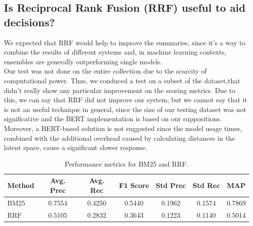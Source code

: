 \subsection{Is Reciprocal Rank Fusion (RRF) useful to aid decisions?}
We expected that RRF would help to improve the summaries, since it's a way to
combine the results of different systems and, in machine learning contexts,
ensembles are generally outperforming single models. \\ Our test was not done
on the entire collection due to the scarcity of computational power. Thus, we
conduced a test on a subset of the dataset,that didn't really show any
particular improvement on the scoring metrics. Due to this, we can say that RRF
did not improve our system, but we cannot say that it is not an useful technique in general, since the size
of our testing dataset was not significative and the BERT implementation is
based on our suppositions. Moreover, a BERT-based solution is not suggested
since the model usage times, combined with the additional overhead caused by
calculating distances in the latent space, cause a significant slower response.


\begin{center}
    \begin{table}[H]
        \centering
        \begin{tabular}{|l|c|c|c|c|c|c|}
            \hline
            Method & Avg. Prec & Avg. Rec & F1 Score & Std Prec & Std Rec & MAP    \\
            \hline
            BM25   & 0.7554    & 0.4250   & 0.5440   & 0.1962   & 0.1574  & 0.7869 \\
            \hline
            RRF    & 0.5105    & 0.2832   & 0.3643   & 0.1223   & 0.1140  & 0.5014 \\
            \hline
        \end{tabular}
        \caption{Performance metrics for BM25 and RRF.}
        \label{tab:bm25_rrf}
    \end{table}
\end{center}

